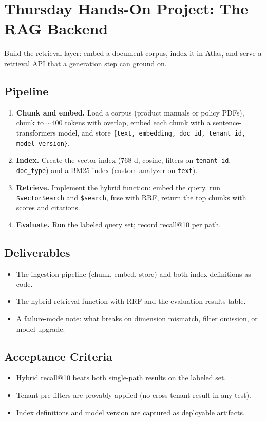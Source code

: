 \section{Thursday Hands-On Project: The RAG Backend}
Build the retrieval layer: embed a document corpus, index it in Atlas, and serve a retrieval API that a generation step can ground on.

\subsection{Pipeline}
\begin{enumerate}
    \item \textbf{Chunk and embed.} Load a corpus (product manuals or policy PDFs), chunk to ${\sim}$400 tokens with overlap, embed each chunk with a sentence-transformers model, and store \texttt{\{text, embedding, doc\_id, tenant\_id, model\_version\}}.
    \item \textbf{Index.} Create the vector index (768-d, cosine, filters on \texttt{tenant\_id}, \texttt{doc\_type}) and a BM25 index (custom analyzer on \texttt{text}).
    \item \textbf{Retrieve.} Implement the hybrid function: embed the query, run \texttt{\$vectorSearch} and \texttt{\$search}, fuse with RRF, return the top chunks with scores and citations.
    \item \textbf{Evaluate.} Run the labeled query set; record recall@10 per path.
\end{enumerate}

\subsection*{Deliverables}
\begin{itemize}
    \item The ingestion pipeline (chunk, embed, store) and both index definitions as code.
    \item The hybrid retrieval function with RRF and the evaluation results table.
    \item A failure-mode note: what breaks on dimension mismatch, filter omission, or model upgrade.
\end{itemize}

\subsection*{Acceptance Criteria}
\begin{itemize}
    \item Hybrid recall@10 beats both single-path results on the labeled set.
    \item Tenant pre-filters are provably applied (no cross-tenant result in any test).
    \item Index definitions and model version are captured as deployable artifacts.
\end{itemize}

